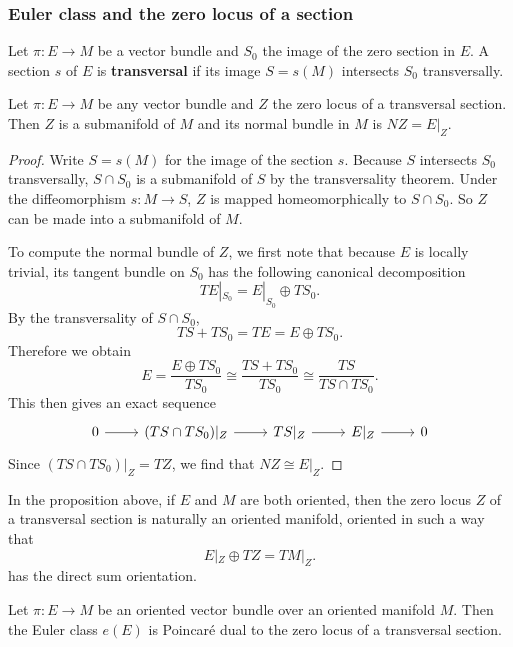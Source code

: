 \subsubsection{Euler class and the zero locus of a section}
Let $\pi:E\to M$ be a vector bundle and $S_0$ the image of the zero section in $E$. A section $s$ of $E$ is \textbf{transversal} if its image $S=s(M)$ intersects $S_0$ 
transversally.
\begin{proposition}\label{tran section normal bundle zero locus}
Let $\pi:E\to M$ be any vector bundle and $Z$ the zero locus of a transversal section. Then $Z$ is a submanifold of $M$ and its normal bundle in $M$ is $NZ=E|_Z$.
\end{proposition}
\begin{proof}
Write $S=s(M)$ for the image of the section $s$. Because $S$ intersects $S_0$ transversally, $S\cap S_0$ is a submanifold of $S$ by the transversality theorem. Under 
the diffeomorphism $s:M\to S$, $Z$ is mapped homeomorphically to $S\cap S_0$. So $Z$ can be made into a submanifold of $M$.\par
To compute the normal bundle of $Z$, we first note that because $E$ is locally trivial, its tangent bundle on $S_0$ has the following canonical decomposition
\[TE|_{S_0}=E|_{S_0}\oplus TS_0.\]
By the transversality of $S\cap S_0$,
\[TS+TS_0=TE=E\oplus TS_0.\]
Therefore we obtain
\[E=\frac{E\oplus TS_0}{TS_0}\cong\frac{TS+TS_0}{TS_0}\cong\frac{TS}{TS\cap TS_0}.\]
This then gives an exact sequence
\[\begin{tikzcd}
0\ar[r]&(TS\cap TS_0)|_Z\ar[r]&TS|_Z\ar[r]&E|_Z\ar[r]&0
\end{tikzcd}\]
Since $(TS\cap TS_0)|_Z=TZ$, we find that $NZ\cong E|_Z$.
\end{proof}
In the proposition above, if $E$ and $M$ are both oriented, then the zero locus $Z$ of a transversal section is naturally an oriented manifold, oriented in such a way 
that
\[E|_Z\oplus TZ=TM|_Z.\]
has the direct sum orientation.
\begin{proposition}
Let $\pi:E\to M$ be an oriented vector bundle over an oriented manifold $M$. Then the Euler class $e(E)$ is Poincar\'e dual to the zero locus of a transversal section.
\end{proposition}
